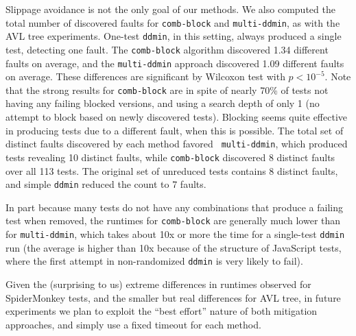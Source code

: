 Slippage avoidance is not the only goal of our methods.  We also computed the total number of discovered faults for
{\tt comb-block} and {\tt multi-ddmin}, as with the AVL tree
experiments.  One-test {\tt ddmin}, in this setting, always produced a
single test, detecting one fault.  The {\tt comb-block} algorithm
discovered 1.34 different faults on average, and the {\tt multi-ddmin}
approach discovered 1.09 different faults on average.  These
differences are significant by Wilcoxon test with $p < 10^{-5}$.  Note
that the strong results for {\tt comb-block} are in spite of nearly
70\% of tests not having any failing blocked versions, and using a
search depth of only 1 (no attempt to block based on newly discovered
tests).  Blocking seems quite effective in producing tests due to a
different fault, when this is possible.  The total set
of distinct faults discovered by each method favored {\tt
  multi-ddmin}, which produced tests revealing 10 distinct faults,
while {\tt comb-block} discovered 8 distinct faults over all 113
tests.  The original set of unreduced tests contains 8 distinct
faults, and simple {\tt ddmin} reduced the count to 7 faults.

In part because many tests do not have any combinations that produce a failing
test when removed, the runtimes for {\tt comb-block} are
generally much lower than for {\tt multi-ddmin}, which takes about 10x
or more the time for a single-test {\tt ddmin} run (the average is
higher than 10x because of the structure of JavaScript tests, where
the first attempt in non-randomized {\tt ddmin} is very likely to
fail).

Given the (surprising to us) extreme differences in runtimes observed
for SpiderMonkey tests, and the smaller but real differences for AVL tree,
in future experiments we plan to exploit the ``best effort'' nature of
both mitigation approaches, and simply use a fixed timeout for each method.
